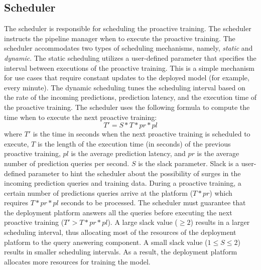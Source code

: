 \subsection{Scheduler}\label{scheduler}
The scheduler is responsible for scheduling the proactive training.
The scheduler instructs the pipeline manager when to execute the proactive training.
The scheduler accommodates two types of scheduling mechanisms, namely, \textit{static} and \textit{dynamic}.
The static scheduling utilizes a user-defined parameter that specifies the interval between executions of the proactive training.
This is a simple mechanism for use cases that require constant updates to the deployed model (for example, every minute).
The dynamic scheduling tunes the scheduling interval based on the rate of the incoming predictions, prediction latency, and the execution time of the proactive training.
The scheduler uses the following formula to compute the time when to execute the next proactive training:
\begin{equation}
T' = S * T * pr * pl
\end{equation}
where $T'$ is the time in seconds when the next proactive training is scheduled to execute, $T$ is the length of the execution time (in seconds) of the previous proactive training, $pl$ is the average prediction latency, and $pr$ is the average number of prediction queries per second.
$S$ is the slack parameter.
Slack is a user-defined parameter to hint the scheduler about the possibility of surges in the incoming prediction queries and training data.
During a proactive training, a certain number of predictions queries arrive at the platform ($T * pr$) which requires $T * pr * pl$ seconds to be processed.
The scheduler must guarantee that the deployment platform answers all the queries before executing the next proactive training ($T' > T * pr * pl$).
A large slack value ($\geq2$) results in a larger scheduling interval, thus allocating most of the resources of the deployment platform to the query answering component.
A small slack value ($1 \leq S \leq 2$) results in smaller scheduling intervals.
As a result, the deployment platform allocates more resources for training the model.
